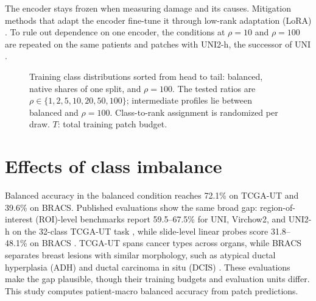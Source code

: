 \documentclass[11pt]{article}
\newcommand{\countlines}[1]{%
  \addplot[black,thick,mark=*,mark size=1pt] table[x=rank,y=r1]{#1};
  \addplot[red!80!black,thick,dashed,mark=square*,mark size=1pt] table[x=rank,y=N]{#1};
  \addplot[tcga,thick,mark=triangle*,mark size=1.4pt] table[x=rank,y=r100]{#1};}
\begin{document}
The encoder stays frozen when measuring damage and its causes. Mitigation methods that adapt the encoder fine-tune it through low-rank adaptation (LoRA) \citep{hu2022lora}. To rule out dependence on one encoder, the conditions at $\rho=10$ and $\rho=100$ are repeated on the same patients and patches with UNI2-h, the successor of UNI \citep{mahmoodlab2025uniRepo}.

\begin{figure}[!htb]
\centering
{}
\caption{Training class distributions sorted from head to tail: balanced, native shares of one split, and $\rho=100$. The tested ratios are $\rho\in\{1,2,5,10,20,50,100\}$; intermediate profiles lie between balanced and $\rho=100$. Class-to-rank assignment is randomized per draw. $T$: total training patch budget.}
\label{fig:dist}
\end{figure}

\section{Effects of class imbalance}
\label{sec:effects}
Balanced accuracy in the balanced condition reaches 72.1\% on TCGA-UT and 39.6\% on BRACS. Published evaluations show the same broad gap: region-of-interest (ROI)-level benchmarks report 59.5--67.5\% for UNI, Virchow2, and UNI2-h on the 32-class TCGA-UT task \citep{mahmoodlab2025uniRepo}, while slide-level linear probes score 31.8--48.1\% on BRACS \citep{vaidya2025threads}. TCGA-UT spans cancer types across organs, while BRACS separates breast lesions with similar morphology, such as atypical ductal hyperplasia (ADH) and ductal carcinoma in situ (DCIS) \citep{brancati2022bracs}. These evaluations make the gap plausible, though their training budgets and evaluation units differ. This study computes patient-macro balanced accuracy from patch predictions.
\end{document}
